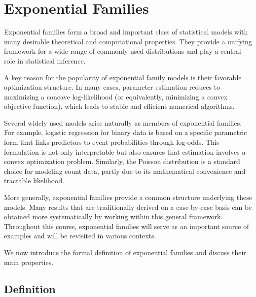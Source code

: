 \chapter{Exponential Families}
\label{cha:exp}

Exponential families form a broad and important class of statistical models with many desirable
theoretical and computational properties. They provide a unifying framework for a wide range of
commonly used distributions and play a central role in statistical inference.

A key reason for the popularity of exponential family models is their favorable optimization
structure. In many cases, parameter estimation reduces to maximizing a concave log-likelihood
(or equivalently, minimizing a convex objective function), which leads to stable and efficient
numerical algorithms.

Several widely used models arise naturally as members of exponential families. For example,
logistic regression for binary data is based on a specific parametric form that links predictors
to event probabilities through log-odds. This formulation is not only interpretable but also
ensures that estimation involves a convex optimization problem. Similarly, the Poisson
distribution is a standard choice for modeling count data, partly due to its mathematical
convenience and tractable likelihood.

More generally, exponential families provide a common structure underlying these models.
Many results that are traditionally derived on a case-by-case basis can be obtained more
systematically by working within this general framework. Throughout this course, exponential
families will serve as an important source of examples and will be revisited in various contexts.

We now introduce the formal definition of exponential families and discuss their main properties.

\section{Definition}%
\label{sec:Definition}

